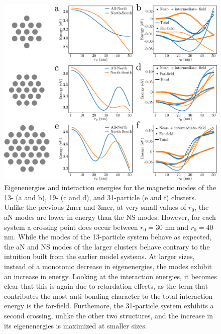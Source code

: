\documentclass[journal=apchd5,manuscript=article]{achemso}
\begin{document}
\begin{figure}
\includegraphics[width=6in]{13_19_31_eigen.pdf}
\caption{Eigenenergies and interaction energies for the magnetic modes of the 13- (a and b), 19- (c and d), and 31-particle (e and f) clusters. Unlike the previous 2mer and 3mer, at very small values of $r_0$, the aN modes are lower in energy than the NS modes. However, for each system a crossing point does occur between $r_0 = 30$ nm and $r_0 = 40$ nm. While the modes of the 13-particle system behave as expected, the aN and NS modes of the larger clusters behave contrary to the intuition built from the earlier model systems. At larger sizes, instead of a monotonic decrease in eigenenergies, the modes exhibit an increase in energy. Looking at the interaction energies, it becomes clear that this is again due to retardation effects, as the term that contributes the most anti-bonding character to the total interaction energy is the far-field. Furthemore, the 31-particle system exhibits a second crossing, unlike the other two structures, and the increase in its eigenenergies is maximized at smaller sizes.}
\label{kagan_eigen}
\end{figure}
\end{document}
